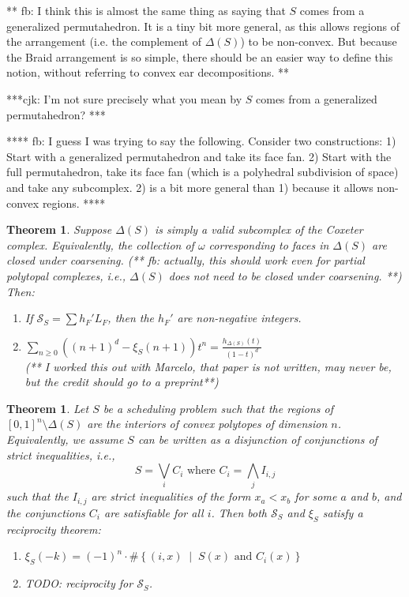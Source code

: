 \documentclass[12pt]{amsart}
\newtheorem{theorem}[definition]{Theorem}
\newcommand{\SSS}{\mathcal{S}}
\newcommand{\mset}[2]{ \left\{ #1 \; \middle| \; #2 \right\}}
\begin{document}
** fb: I think this is almost the same thing as saying that $S$ comes from a generalized permutahedron. It is a tiny bit more general, as this allows regions of the arrangement (i.e. the complement of $\Delta(S)$) to be non-convex. But because the Braid arrangement is so simple, there should be an easier way to define this notion, without referring to convex ear decompositions. **

***cjk: I'm not sure precisely what you mean by $S$ comes from a generalized permutahedron? ***

**** fb: I guess I was trying to say the following. Consider two constructions: 1) Start with a generalized permutahedron and take its face fan. 2) Start with the full permutahedron, take its face fan (which is a polyhedral subdivision of space) and take any subcomplex. 2) is a bit more general than 1) because it allows non-convex regions. ****

\begin{theorem}
Suppose $\Delta(S)$ is simply a valid subcomplex of the Coxeter complex.  Equivalently, the collection of $\omega$ 
corresponding to faces in $\Delta(S)$ are closed under coarsening. (** fb: actually, this should work even for partial polytopal complexes, i.e., $\Delta(S)$ does not need to be closed under coarsening. **) Then:
\begin{enumerate}
\item If $\SSS_S = \sum h_F' L_F$, then the $h_F'$ are non-negative integers.
\item $ \sum_{n \geq 0} ((n+1)^d - \xi_S(n+1)) t^n = \frac{h_{\Delta(S)}(t)}{(1-t)^d} $ \\
(** I worked this out with Marcelo, that paper is not written, may never be, but the credit should go to a preprint**) 
\end{enumerate}
\end{theorem}

\begin{theorem}
Let $S$ be a scheduling problem such that the regions of $[0,1]^n\setminus\Delta(S)$ are the interiors of convex polytopes of dimension $n$. Equivalently, we assume $S$ can be written as a disjunction of conjunctions of strict inequalities, i.e.,
\[
  S = \bigvee_i C_i \text{ where } C_i = \bigwedge_j I_{i,j}
\] 
such that the $I_{i,j}$ are strict inequalities of the form $x_a < x_b$ for some $a$ and $b$, and the conjunctions $C_i$ are satisfiable for all $i$. Then both $\SSS_S$ and $\xi_S$ satisfy a reciprocity theorem:
\begin{enumerate}
\item $\xi_S(-k) = (-1)^n\cdot \#\mset{(i,x)}{S(x) \text{ and } C_i(x)}$
\item TODO: reciprocity for $\SSS_S$.
\end{enumerate}
\end{theorem}
\end{document}
